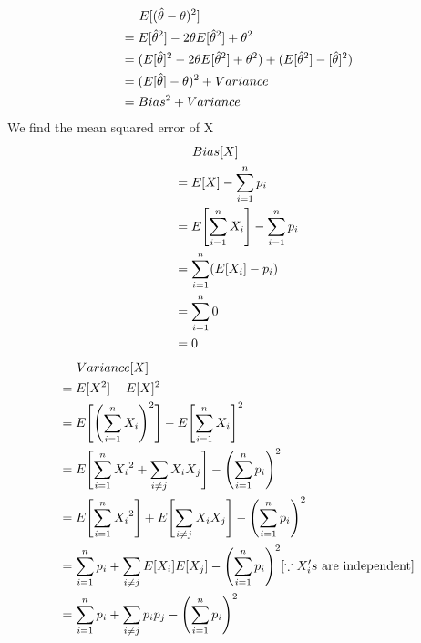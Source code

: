 \documentclass[12pt,letterpaper,fleqn]{article}
\begin{document}
\begin{flushleft}
  \begin{equation}
    \begin{split}
      &\hspace{1.4em}E[(\hat{\theta} - \theta)^2]\\
      &= E[\hat{\theta}^2] - 2\theta E[\hat{\theta}^2] + \theta ^2\\
      &= (E[\hat{\theta}]^2 - 2\theta E[\hat{\theta}^2] + \theta ^2) + (E[\hat{\theta}^2] - [\hat{\theta}]^2)\\
      &= (E[\hat{\theta}] - \theta)^2 + Variance\\
      &= Bias^2 + Variance\\
    \end{split}
  \end{equation}
  We find the mean squared error of X
  \begin{equation}
    \begin{split}
      &\hspace{1.4em}Bias[X]\\
      &= E[X] - \sum_{i=1}^n p_i\\
      &= E\Biggl[\sum_{i=1}^n X_i\Biggr] - \sum_{i=1}^n p_i\\
      &= \sum_{i=1}^n (E[X_i] - p_i)\\
      &= \sum_{i=1}^n 0\\
      &= 0
    \end{split}
  \end{equation}
  \begin{equation}
    \begin{split}
      &\hspace{1.4em}Variance[X]\\
      &= E[X^2] - E[X]^2\\
      &= E\Biggl[\Biggl(\sum_{i=1}^n X_i\Biggr)^2\Biggr] - E\Biggl[\sum_{i=1}^n X_i\Biggr]^2\\
      &= E\Biggl[\sum_{i=1}^n {X_i}^2 + \sum_{i \neq j} X_i X_j \Biggr] - \Biggl(\sum_{i=1}^n p_i\Biggr)^2\\
      &= E\Biggl[\sum_{i=1}^n {X_i}^2\Biggr] + E\Biggl[\sum_{i \neq j} X_i X_j \Biggr] - \Biggl(\sum_{i=1}^n p_i\Biggr)^2\\
      &= \sum_{i=1}^n p_i + \sum_{i \neq j} E[X_i]E[X_j] - \Biggl(\sum_{i=1}^n p_i\Biggr)^2 \hfill [\because X_i's\text{ are independent}]\\
      &= \sum_{i=1}^n p_i + \sum_{i \neq j} p_i p_j - \Biggl(\sum_{i=1}^n p_i\Biggr)^2\\

\end{split}
\end{equation}
\end{flushleft}
\end{document}
